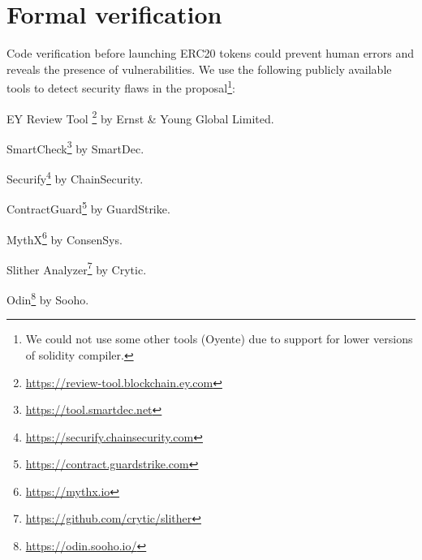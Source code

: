 
\section{Formal verification}\label{section:ver}
Code verification before launching ERC20 tokens could prevent human errors and reveals the presence of vulnerabilities. We use the following publicly available tools \cite{AuditTools} to detect security flaws in the proposal\footnote{We could not use some other tools (\eg Oyente) due to support for lower versions of solidity compiler.}:
\begin{enumerate}[leftmargin=*,label={[\arabic*]}]
	\item EY Review Tool \footnote{\url{https://review-tool.blockchain.ey.com}} by Ernst \& Young Global Limited.
	\item SmartCheck\footnote{\url{https://tool.smartdec.net}} by SmartDec.
	\item Securify\footnote{\url{https://securify.chainsecurity.com}} by ChainSecurity.
	\item ContractGuard\footnote{\url{https://contract.guardstrike.com}} by GuardStrike.
	\item MythX\footnote{\url{https://mythx.io}} by ConsenSys.
	\item Slither Analyzer\footnote{\url{https://github.com/crytic/slither}} by Crytic.
	\item Odin\footnote{\url{https://odin.sooho.io/}} by Sooho.
\end{enumerate}


